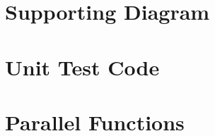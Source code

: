 \documentclass[a4paper,11pt]{report}
\begin{document}
    \newcommand{\currAppendixLetter}{A}
    \newcommand{\currAppendixTitle}{Supporting Diagram}
    \begin{appendices}
        
        \renewcommand{\currAppendixLetter}{A}
        \renewcommand{\currAppendixTitle}{Supporting Diagram}
        \renewcommand{\thesubsection}{\currAppendixLetter.\arabic{subsection}}
        \renewcommand{\thesection}{\currAppendixLetter.\arabic{section}}
        \renewcommand{\thechapter}{\currAppendixLetter}
        \renewcommand{\thesubsubsection}{\currAppendixLetter.\arabic{subsection}.\arabic{subsubsection}}
        \renewcommand{\lstlistingname}{Code Snippet}
        \chapter{\currAppendixTitle}
        \label{Appendix::Support}
        

        \renewcommand{\currAppendixLetter}{B}
        \renewcommand{\currAppendixTitle}{Unit Test Code}
        \renewcommand{\thesubsection}{\currAppendixLetter.\arabic{subsection}}
        \renewcommand{\thesection}{\currAppendixLetter.\arabic{section}}
        \renewcommand{\thechapter}{\currAppendixLetter}
        \renewcommand{\thesubsubsection}{\currAppendixLetter.\arabic{subsection}.\arabic{subsubsection}}
        \renewcommand{\lstlistingname}{Code Snippet}
        \chapter{\currAppendixTitle}
        \label{Appendix::Test}
        
        
        \renewcommand{\currAppendixLetter}{C}
        \renewcommand{\currAppendixTitle}{Parallel Functions}
        \renewcommand{\thesubsection}{\currAppendixLetter.\arabic{subsection}}
        \renewcommand{\thesection}{\currAppendixLetter.\arabic{section}}
        \renewcommand{\thechapter}{\currAppendixLetter}
        \renewcommand{\thesubsubsection}{\currAppendixLetter.\arabic{subsection}.\arabic{subsubsection}}
        \renewcommand{\lstlistingname}{Code Snippet}
        \chapter{\currAppendixTitle}
        \label{Appendix::Parallel}
        
        

\end{appendices}
\end{document}
